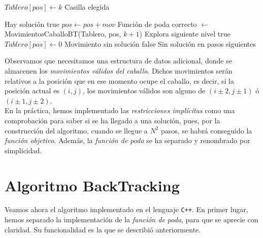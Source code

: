 \documentclass[11pt]{article}
\begin{document}
\begin{algorithm}[H]
\begin{algorithmic}

     \State $Tablero[pos] \gets k$ \Comment Casilla elegida

      \Comment Hay solución
     	\State \Return true
    	\EndIf
         \State $pos \gets pos + mov$
          \Comment Función de poda
         	\State correcto $\gets$ MovimientosCaballoBT(Tablero, pos, $k+1$) \Comment 						Explora siguiente nivel
         		\State \Return true
         	\Else
         		\State $Tablero[pos] \gets 0$ \Comment Movimiento sin solución
         	\EndIf
         \EndIf
      \EndFor
     \State \Return false \Comment  Sin solución en pasos siguientes
  \EndFunction
\end{algorithmic}
\end{algorithm}

Observamos que necesitamos una estructura de datos adicional, donde se almacenen los \textit{movimientos válidos del caballo}. Dichos movimientos serán relativos a la posición que en ese momento ocupe el caballo, es decir, si la posición actual es $(i,j)$, los movimientos válidos son alguno de $(i \pm 2, j \pm 1)$ ó $(i \pm 1, j \pm 2)$.\\

En la práctica, hemos implementado las \textit{restricciones implícitas} como una comprobación para saber si se ha llegado a una solución, pues, por la construcción del algoritmo, cuando se llegue a $N^2$ pasos, se habrá conseguido la \textit{función objetivo}. Además, la \textit{función de poda} se ha separado y renombrado por simplicidad.

\section*{Algoritmo BackTracking}

Veamos ahora el algoritmo implementado en el lenguaje \verb|C++|. En primer lugar, hemos separado la implementación de la \textit{función de poda}, para que se aprecie con claridad. Su funcionalidad es la que se describió anteriormente.

	
\vspace{1em}
\end{document}
